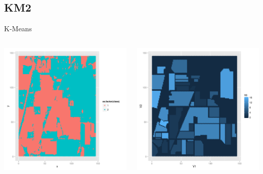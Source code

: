 \documentclass[11pt]{beamer}
\begin{document}
\subsection{KM2}
\begin{frame}{K-Means}
\begin{columns}[T]
\begin{column}{.48\textwidth}
\includegraphics[scale=.3]{km2.png}
\end{column}
\hfill
\begin{column}{.48\textwidth}
\includegraphics[scale=.3]{gt.png}
\end{column}
\end{columns}
\end{frame}
\end{document}
